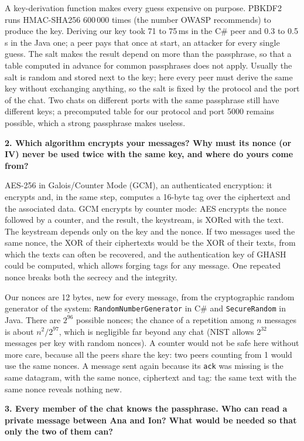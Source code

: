 \documentclass[11pt,a4paper]{article}
\newcommand{\question}[1]{\par\medskip\textbf{#1}\par}
\newcommand{\code}[1]{{\frenchspacing\texttt{#1}}}
\begin{document}
A key-derivation function makes every guess expensive on purpose. PBKDF2 runs HMAC-SHA256 600\,000
times (the number OWASP recommends) to produce the key. Deriving our key took 71 to 75\,ms in the C\#
peer and 0.3 to 0.5\,s in the Java one; a peer pays that once at start, an attacker for every single
guess. The salt makes the result depend on more than the passphrase, so that a table computed in
advance for common passphrases does not apply. Usually the salt is random and stored next to the
key; here every peer must derive the same key without exchanging anything, so the salt is fixed by
the protocol and the port of the chat. Two chats on different ports with the same passphrase still
have different keys; a precomputed table for our protocol and port 5000 remains possible, which a
strong passphrase makes useless.

\question{2. Which algorithm encrypts your messages? Why must its nonce (or IV) never be used twice
with the same key, and where do yours come from?}

AES-256 in Galois/Counter Mode (GCM), an authenticated encryption: it encrypts and, in the same
step, computes a 16-byte tag over the ciphertext and the associated data. GCM encrypts by counter
mode: AES encrypts the nonce followed by a counter, and the result, the keystream, is XORed with the
text. The keystream depends only on the key and the nonce. If two messages used the same nonce, the
XOR of their ciphertexts would be the XOR of their texts, from which the texts can often be
recovered, and the authentication key of GHASH could be computed, which allows forging tags for any
message. One repeated nonce breaks both the secrecy and the integrity.

Our nonces are 12 bytes, new for every message, from the cryptographic random generator of the
system: \code{RandomNumberGenerator} in C\# and \code{SecureRandom} in Java. There are
$2^{96}$ possible nonces; the chance of a repetition among $n$ messages is about $n^2/2^{97}$, which
is negligible far beyond any chat (NIST allows $2^{32}$ messages per key with random nonces). A
counter would not be safe here without more care, because all the peers share the key: two peers
counting from 1 would use the same nonces. A message sent again because its \code{ack} was missing
is the same datagram, with the same nonce, ciphertext and tag: the same text with the same nonce
reveals nothing new.

\question{3. Every member of the chat knows the passphrase. Who can read a private message between
Ana and Ion? What would be needed so that only the two of them can?}
\end{document}

